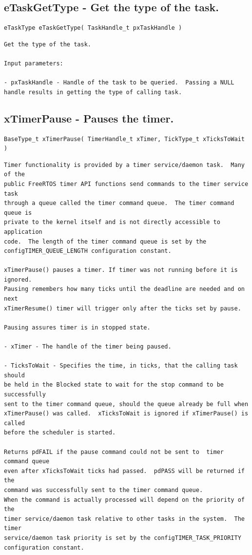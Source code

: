 \subsection{eTaskGetType -  Get the type of the task.}
\label{rt_cmd:eTaskGetType}
\begin{verbatim}
eTaskType eTaskGetType( TaskHandle_t pxTaskHandle )
\end{verbatim}
\begin{lstlisting}
Get the type of the task.

Input parameters:

- pxTaskHandle - Handle of the task to be queried.  Passing a NULL
handle results in getting the type of calling task.

\end{lstlisting}

\subsection{xTimerPause -  Pauses the timer.}
\label{rt_cmd:xTimerPause}

\begin{verbatim}
BaseType_t xTimerPause( TimerHandle_t xTimer, TickType_t xTicksToWait )
\end{verbatim}

\begin{lstlisting}
Timer functionality is provided by a timer service/daemon task.  Many of the
public FreeRTOS timer API functions send commands to the timer service task
through a queue called the timer command queue.  The timer command queue is
private to the kernel itself and is not directly accessible to application
code.  The length of the timer command queue is set by the
configTIMER_QUEUE_LENGTH configuration constant.

xTimerPause() pauses a timer. If timer was not running before it is ignored.
Pausing remembers how many ticks until the deadline are needed and on next
xTimerResume() timer will trigger only after the ticks set by pause.

Pausing assures timer is in stopped state.
 
- xTimer - The handle of the timer being paused.

- TicksToWait - Specifies the time, in ticks, that the calling task should
be held in the Blocked state to wait for the stop command to be successfully
sent to the timer command queue, should the queue already be full when
xTimerPause() was called.  xTicksToWait is ignored if xTimerPause() is called
before the scheduler is started.

Returns pdFAIL if the pause command could not be sent to  timer command queue
even after xTicksToWait ticks had passed.  pdPASS will be returned if the
command was successfully sent to the timer command queue.
When the command is actually processed will depend on the priority of the
timer service/daemon task relative to other tasks in the system.  The timer
service/daemon task priority is set by the configTIMER_TASK_PRIORITY
configuration constant.

\end{lstlisting}


